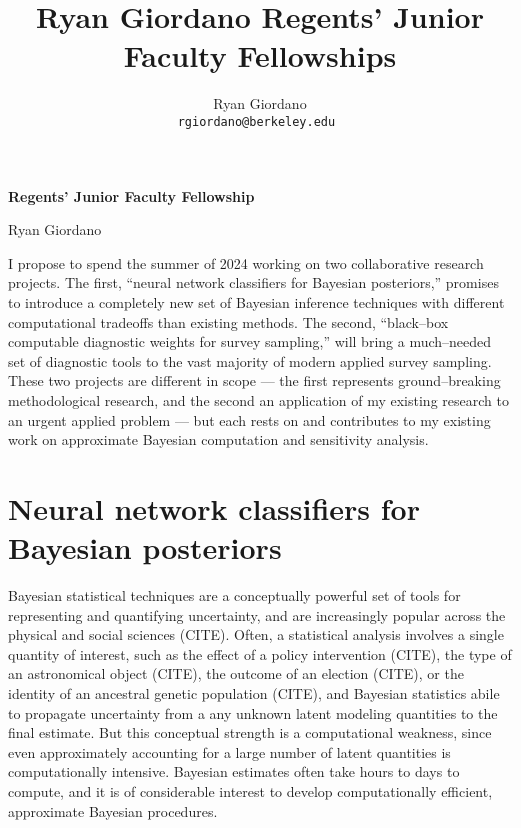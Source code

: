 
\usepackage{enumitem}

\usepackage{geometry}
\geometry{top=1.0in}
\geometry{left=1.1in}
\geometry{right=1.1in}

\title{Ryan Giordano Regents’ Junior Faculty Fellowships}

\author{
  Ryan Giordano \\ \texttt{rgiordano@berkeley.edu }
}



\begin{minipage}[t]{0.7\textwidth}
\hspace{-2em} %
{\bf \LARGE Regents’ Junior Faculty Fellowship}\\
\end{minipage}
\begin{minipage}[t]{0.3\textwidth}
        {\LARGE Ryan Giordano}
\end{minipage}

I propose to spend the summer of 2024 working on two collaborative research
projects.  The first, ``neural network classifiers for Bayesian posteriors,''
promises to introduce a completely new set of Bayesian inference techniques with
different computational tradeoffs than existing methods. The second,
``black--box computable diagnostic weights for survey sampling,'' will bring a
much--needed set of diagnostic tools to the vast majority of modern applied
survey sampling.  These two projects are different in scope --- the first
represents ground--breaking methodological research, and the second an
application of my existing research to an urgent applied problem --- but each
rests on and contributes to my existing work on approximate Bayesian computation
and sensitivity analysis. 





\section*{Neural network classifiers for Bayesian posteriors}

Bayesian statistical techniques are a conceptually powerful set of tools for
representing and quantifying uncertainty, and are increasingly popular across
the physical and social sciences (CITE).  Often, a statistical analysis involves
a single quantity of interest, such as the effect of a policy intervention
(CITE), the type of an astronomical object (CITE), the outcome of an election
(CITE), or the identity of an ancestral genetic population (CITE), and Bayesian
statistics abile to propagate uncertainty from a any unknown latent modeling
quantities to the final estimate.  But this conceptual strength is a
computational weakness, since even approximately accounting for a large number
of latent quantities is computationally intensive.  Bayesian estimates often
take hours to days to compute, and it is of considerable interest to develop
computationally efficient, approximate Bayesian procedures.

